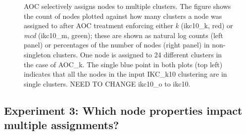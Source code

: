 \documentclass[12pt, oneside]{article}   	%
\begin{document}
\begin{figure}[H]
\begin{subfigure}[t]{0.48\textwidth}
    	\end{subfigure}
\captionsetup{width=0.9\textwidth}	
\caption{AOC selectively assigns nodes to multiple clusters. The figure shows the count of nodes plotted against how many clusters a node was assigned to after AOC treatment enforcing either \emph{k} (ikc10\_k, red) or \emph{mcd} (ikc10\_m, green);  these are shown as natural log counts (left panel) or percentages of the number of nodes (right panel) in non-singleton clusters. One node is assigned to 24 different clusters in the case of AOC\_k. The single blue point in both plots (top left) indicates that all the nodes in the input IKC\_k10 clustering are in single clusters. NEED TO CHANGE ikc10\_o to ikc10.}
\label{fig:fig2}
\end{figure}

\subsection{Experiment 3: Which node properties impact multiple assignments?}
\end{document}
